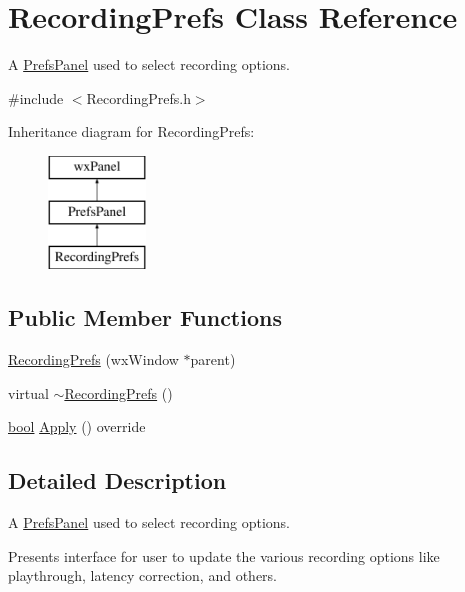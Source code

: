 \hypertarget{class_recording_prefs}{}\section{Recording\+Prefs Class Reference}
\label{class_recording_prefs}


A \hyperlink{class_prefs_panel}{Prefs\+Panel} used to select recording options.  




{\ttfamily \#include $<$Recording\+Prefs.\+h$>$}

Inheritance diagram for Recording\+Prefs\+:\begin{figure}[H]
\begin{center}
\leavevmode
\includegraphics[height=3.000000cm]{class_recording_prefs}
\end{center}
\end{figure}
\subsection*{Public Member Functions}
\begin{DoxyCompactItemize}
\item 
\hyperlink{class_recording_prefs_a182d2d8abb295a20a8b3ae475c6f0393}{Recording\+Prefs} (wx\+Window $\ast$parent)
\item 
virtual \hyperlink{class_recording_prefs_ad8a562699469db36e23d061723397d7c}{$\sim$\+Recording\+Prefs} ()
\item 
\hyperlink{mac_2config_2i386_2lib-src_2libsoxr_2soxr-config_8h_abb452686968e48b67397da5f97445f5b}{bool} \hyperlink{class_recording_prefs_a84b274b5c5ba71fa73b33399f2c567b8}{Apply} () override
\end{DoxyCompactItemize}


\subsection{Detailed Description}
A \hyperlink{class_prefs_panel}{Prefs\+Panel} used to select recording options. 

Presents interface for user to update the various recording options like playthrough, latency correction, and others. 

